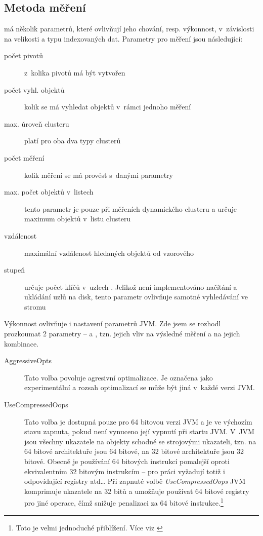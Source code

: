 \subsection{Metoda měření\label{sec:measurementmethod}}

\MIndex{} má několik parametrů, které ovlivňují jeho chování, resp. výkonnost, v~závislosti na velikosti a typu indexovaných dat. Parametry pro měření jsou následující:
\begin{description}
\item[počet pivotů] z~kolika pivotů má být vytvořen \MIndex{}
\item[počet vyhl. objektů] kolik se má vyhledat objektů v~rámci jednoho měření
\item[max. úroveň clusteru] platí pro oba dva typy clusterů
\item[počet měření] kolik měření se má provést s~danými parametry
\item[max. počet objektů v~listech] tento parametr je pouze při měřeních dynamického clusteru a určuje maximum objektů v~listu clusteru
\item[vzdálenost] maximální vzdálenost hledaných objektů od vzorového
\item[stupeň \BPTree{}] určuje počet klíčů v~uzlech \BPTree{}. Jelikož není implementováno načítání a ukládání uzlů na disk, tento parametr ovlivňuje samotné vyhledávání ve stromu
\end{description}

Výkonnost  ovlivňuje i nastavení parametrů JVM.
Zde jsem se rozhodl prozkoumat 2 parametry --  a , tzn. jejich vliv na výsledné měření a na jejich kombinace.

\begin{description}
\item[AggressiveOpts] Tato volba povoluje agresivní optimalizace.
Je označena jako experimentální a rozsah optimalizací se může být jiná v~každé verzi JVM.
\item[UseCompressedOops] Tato volba je dostupná pouze pro 64 bitovou verzi JVM a je ve výchozím stavu zapnuta, pokud není vynuceno její vypnutí při startu JVM.
V~JVM jsou všechny ukazatele na objekty schodné se strojovými ukazateli, tzn. na 64 bitové architektuře jsou 64 bitové, na 32 bitové architektuře jsou 32 bitové.
Obecně je používání 64 bitových instrukcí pomalejší oproti ekvivalentním 32 bitovým instrukcím -- pro práci vyžadují totiž i odpovídající registry atd\ldots{}
Při zapnuté volbě \emph{UseCompressedOops} JVM komprimuje ukazatele na 32 bitů a umožňuje používat 64 bitové registry pro jiné operace, čímž snižuje penalizaci za 64 bitové instrukce.\footnote{Toto je velmi jednoduché přiblížení. Více viz \cite{hunt2011java}}
\end{description}


